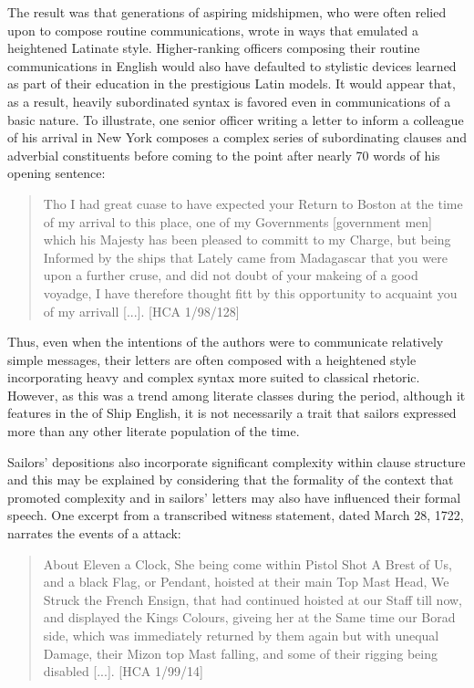 The result was that generations of aspiring midshipmen, who were often relied upon to compose routine communications, wrote in ways that emulated a heightened Latinate style. Higher-ranking officers composing their routine communications in English would also have defaulted to stylistic devices learned as part of their education in the prestigious Latin models. It would appear that, as a result, heavily subordinated syntax is favored even in communications of a basic nature. To illustrate, one senior officer writing a letter to inform a colleague of his arrival in New York composes a complex series of subordinating clauses and adverbial constituents before coming to the point after nearly 70 words of his opening sentence:

\begin{quotation}
Tho I had great cuase to have expected your Return to Boston at the time of my arrival to this place, one of my Governments [government men] which his Majesty has been pleased to committ to my Charge, but being Informed by the ships that Lately came from Madagascar that you were upon a further cruse, and did not doubt of your makeing of a good voyadge, I have therefore thought fitt by this opportunity to acquaint you of my arrivall [...]. [HCA 1/98/128]
\end{quotation}

Thus, even when the intentions of the authors were to communicate relatively simple messages, their letters are often composed with a heightened style incorporating heavy  and complex syntax more suited to classical rhetoric. However, as this was a trend among literate classes during the period, although it features in the  of Ship English, it is not necessarily a trait that sailors expressed more than any other literate population of the time. 

Sailors’ depositions also incorporate significant complexity within clause structure and this may be explained by considering that the formality of the context that promoted complexity and  in sailors’ letters may also have influenced their formal speech.  One excerpt from a transcribed witness statement, dated March 28, 1722, narrates the events of a  attack:

\begin{quotation}
About Eleven a Clock, She being come within Pistol Shot A Brest of Us, and a black Flag, or Pendant, hoisted at their main Top Mast Head, We Struck the French Ensign, that had continued hoisted at our Staff till now, and displayed the Kings Colours, giveing her at the Same time our Borad side, which was immediately returned by them again but with unequal Damage, their Mizon top Mast falling, and some of their rigging being disabled [...]. [HCA 1/99/14] 
\end{quotation}


